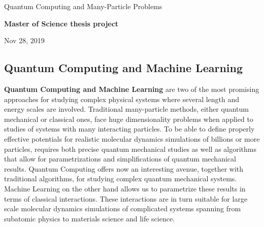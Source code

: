 \documentclass[%
oneside,                 %
final,                   %
10pt]{article}
\begin{document}

\newcommand{\exercisesection}[1]{\subsection*{#1}}






\thispagestyle{empty}

\begin{center}
{\LARGE\bf
\begin{spacing}{1.25}
Quantum Computing and Many-Particle Problems
\end{spacing}
}
\end{center}


\begin{center}
{\bf Master of Science thesis project${}^{}$} \\ [0mm]
\end{center}

\begin{center}
\end{center}
    

\begin{center}
Nov 28, 2019
\end{center}

\vspace{1cm}


\subsection*{Quantum Computing and Machine Learning}



\textbf{Quantum Computing and Machine Learning} are two of the most promising
approaches for studying complex physical systems where several length
and energy scales are involved.  Traditional many-particle methods,
either quantum mechanical or classical ones, face huge dimensionality
problems when applied to studies of systems with many interacting
particles. To be able to define properly effective potentials for
realistic molecular dynamics simulations of billions or more particles,
requires both precise quantum mechanical studies as well as algorithms
that allow for parametrizations and simplifications of quantum
mechanical results. Quantum Computing offers now an interesting
avenue, together with traditional algorithms, for studying complex
quantum mechanical systems. Machine Learning on the other hand allows us to parametrize
these results in terms of classical interactions. These interactions
are in turn suitable for large scale molecular dynamics simulations of
complicated systems spanning from subatomic physics to materials
science and life science.
\end{document}
